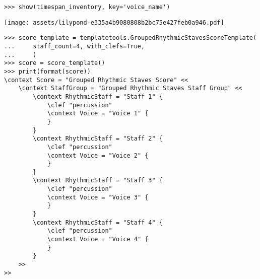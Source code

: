 \begin{comment}
<abjad>
show(timespan_inventory, key='voice_name')
score_template = templatetools.GroupedRhythmicStavesScoreTemplate(
    staff_count=4, with_clefs=True,
    )
score = score_template()
print(format(score))
</abjad>
\end{comment}

\begin{abjadbookoutput}
\begin{singlespacing}
\vspace{-0.5\baselineskip}
\begin{verbatim}
>>> show(timespan_inventory, key='voice_name')
\end{verbatim}
\noindent\texttt{[image: assets/lilypond-e335a4b9080808b2bc75e427feb0a946.pdf]}
\begin{verbatim}
>>> score_template = templatetools.GroupedRhythmicStavesScoreTemplate(
...     staff_count=4, with_clefs=True,
...     )
>>> score = score_template()
>>> print(format(score))
\context Score = "Grouped Rhythmic Staves Score" <<
    \context StaffGroup = "Grouped Rhythmic Staves Staff Group" <<
        \context RhythmicStaff = "Staff 1" {
            \clef "percussion"
            \context Voice = "Voice 1" {
            }
        }
        \context RhythmicStaff = "Staff 2" {
            \clef "percussion"
            \context Voice = "Voice 2" {
            }
        }
        \context RhythmicStaff = "Staff 3" {
            \clef "percussion"
            \context Voice = "Voice 3" {
            }
        }
        \context RhythmicStaff = "Staff 4" {
            \clef "percussion"
            \context Voice = "Voice 4" {
            }
        }
    >>
>>
\end{verbatim}
\end{singlespacing}
\end{abjadbookoutput}

